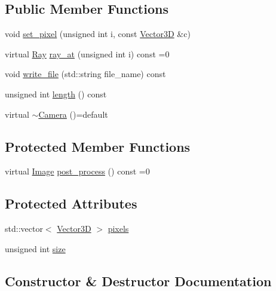\subsection*{Public Member Functions}
\begin{DoxyCompactItemize}
\item 
void \mbox{\hyperlink{classcamera_1_1Camera_aa6152a7c756850336a977d21a4462c6f}{set\+\_\+pixel}} (unsigned int i, const \mbox{\hyperlink{classVector3D}{Vector3D}} \&c)
\item 
virtual \mbox{\hyperlink{classRay}{Ray}} \mbox{\hyperlink{classcamera_1_1Camera_adf751a32f3b3b9ea5df48affafc39732}{ray\+\_\+at}} (unsigned int i) const =0
\item 
void \mbox{\hyperlink{classcamera_1_1Camera_ab437e0cd4a3f5206002d870ecc2bd8e0}{write\+\_\+file}} (std\+::string file\+\_\+name) const
\item 
unsigned int \mbox{\hyperlink{classcamera_1_1Camera_a26d65b2bb9b5337cf586e8fb33c41127}{length}} () const
\item 
virtual \mbox{\hyperlink{classcamera_1_1Camera_ae53a2162b5909211552ec49de1f5a746}{$\sim$\+Camera}} ()=default
\end{DoxyCompactItemize}
\subsection*{Protected Member Functions}
\begin{DoxyCompactItemize}
\item 
virtual \mbox{\hyperlink{namespacecamera_a7ac4fbfbf1f82c10ad94680fb8113483}{Image}} \mbox{\hyperlink{classcamera_1_1Camera_a56d942e3c4b51263bd7af3351da15d9f}{post\+\_\+process}} () const =0
\end{DoxyCompactItemize}
\subsection*{Protected Attributes}
\begin{DoxyCompactItemize}
\item 
std\+::vector$<$ \mbox{\hyperlink{classVector3D}{Vector3D}} $>$ \mbox{\hyperlink{classcamera_1_1Camera_a53f3fe9b838bc48e9ec21973dc8b516c}{pixels}}
\item 
unsigned int \mbox{\hyperlink{classcamera_1_1Camera_ac05b929c8b4f40d74ee682c4aad4c53d}{size}}
\end{DoxyCompactItemize}


\subsection{Constructor \& Destructor Documentation}
\mbox{\label{classcamera_1_1Camera_ae53a2162b5909211552ec49de1f5a746}} 
